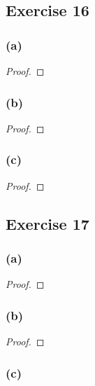 \documentclass[14pt]{extarticle}
\begin{document}
\subsection{Exercise 16}

\subsubsection{(a)}

\begin{proof}

\end{proof}

\subsubsection{(b)}

\begin{proof}

\end{proof}

\subsubsection{(c)}

\begin{proof}

\end{proof}

\subsection{Exercise 17}

\subsubsection{(a)}

\begin{proof}

\end{proof}

\subsubsection{(b)}

\begin{proof}

\end{proof}

\subsubsection{(c)}
\end{document}
